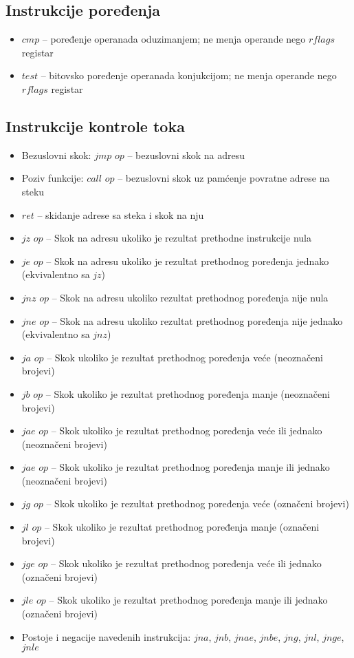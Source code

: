\documentclass[a4paper, 10pt]{article}
\begin{document}
	\subsection{Instrukcije poređenja}
	\begin{itemize}
		\item $cmp$ -- poređenje operanada oduzimanjem; ne menja operande nego $rflags$ registar
		\item $test$ -- bitovsko poređenje operanada konjukcijom; ne menja operande nego $rflags$ registar
	\end{itemize}
	\subsection{Instrukcije kontrole toka}
	\begin{itemize}
		\item Bezuslovni skok: $jmp$ $op$ -- bezuslovni skok na adresu
		\item Poziv funkcije: $call$ $op$ -- bezuslovni skok uz pamćenje povratne adrese na steku
		\item $ret$ -- skidanje adrese sa steka i skok na nju
		\item $jz$ $op$ -- Skok na adresu ukoliko je rezultat prethodne instrukcije nula
		\item $je$ $op$ -- Skok na adresu ukoliko je rezultat prethodnog poređenja jednako (ekvivalentno sa $jz$)
		\item $jnz$ $op$ -- Skok na adresu ukoliko rezultat prethodnog poređenja nije nula
		\item $jne$ $op$ -- Skok na adresu ukoliko rezultat prethodnog poređenja nije jednako (ekvivalentno sa $jnz$)
		\item $ja$ $op$ -- Skok ukoliko je rezultat prethodnog poređenja veće (neoznačeni brojevi)
		\item $jb$ $op$ -- Skok ukoliko je rezultat prethodnog poređenja manje (neoznačeni brojevi)
		\item $jae$ $op$ -- Skok ukoliko je rezultat prethodnog poređenja veće ili jednako (neoznačeni brojevi)
		\item $jae$ $op$ -- Skok ukoliko je rezultat prethodnog poređenja manje ili jednako (neoznačeni brojevi)
		\item $jg$ $op$ -- Skok ukoliko je rezultat prethodnog poređenja veće (označeni brojevi)
		\item $jl$ $op$ -- Skok ukoliko je rezultat prethodnog poređenja manje (označeni brojevi)
		\item $jge$ $op$ -- Skok ukoliko je rezultat prethodnog poređenja veće ili jednako (označeni brojevi)
		\item $jle$ $op$ -- Skok ukoliko je rezultat prethodnog poređenja manje ili jednako (označeni brojevi)
		\item Postoje i negacije navedenih instrukcija: $jna$, $jnb$, $jnae$, $jnbe$, $jng$, $jnl$, $jnge$, $jnle$
	\end{itemize}
\end{document}
